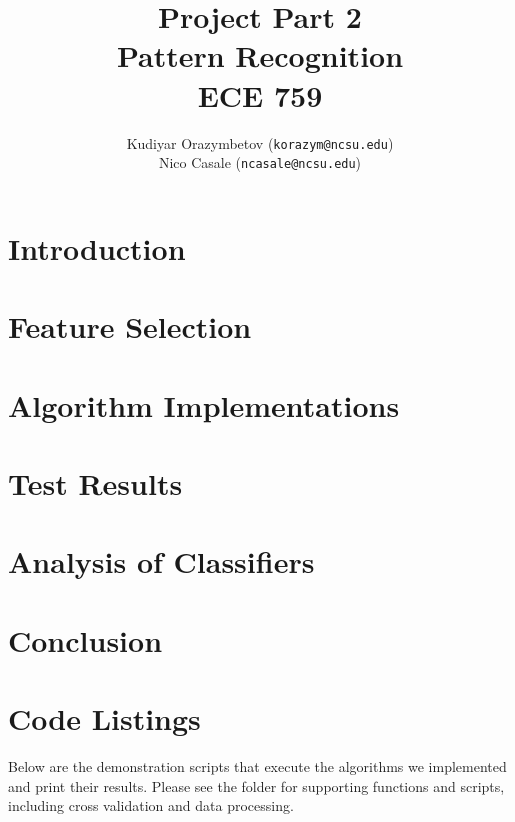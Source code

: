 \documentclass[]{ncmathy}
\newcommand{\theassignment}{Project Part 2}
\newcommand{\thecourse}{Pattern Recognition\\ECE 759}
\begin{document}
\title{\theassignment\\\thecourse}
\author{Kudiyar Orazymbetov (\texttt{korazym@ncsu.edu})\\Nico Casale (\texttt{ncasale@ncsu.edu})}

\makeFancyTitle
\setcounter{tocdepth}{2}
\tableofcontents
\pagebreak
\chead{} %
\makeatletter
\let\@starttoc\@multitoc@starttoc
\listoffigures
\listoftables
\lstlistoflistings
\makeatother
\pagebreak
\chead{\textcolor{Red}\thesection :\ \textcolor{Red}\leftmark}

\section{Introduction} 
	

\section{Feature Selection}
	

\section{Algorithm Implementations}
	
        
	

\section{Test Results}
	

\section{Analysis of Classifiers}
	

\section{Conclusion}
	




\section{Code Listings}

Below are the demonstration scripts that execute the algorithms we implemented and print their results. Please see the
 folder for supporting functions and scripts, including cross validation and data processing.





\end{document}
